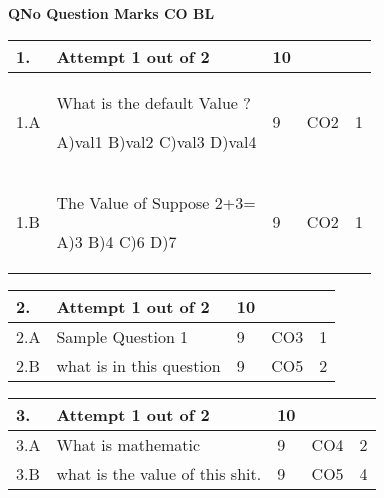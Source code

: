 \documentclass[12pt]{article}
\begin{document}
	\begin{flushleft}
	\bf{QNo}\hspace{1.2cm} \bf{Question} \hspace{5.5cm}  \bf{Marks} \hspace{0.2cm} \bf{CO} \hspace{0.2cm}	\bf{BL}	
	
\end{flushleft} 
	\begin{longtable}{|L{1cm}|L{8cm}|C{1cm}|C{1cm}|C{1cm}|}\hline
		\bf{1}. & \bf{Attempt} \bf1 \bf{out} of \bf2 & \bf10  & & \\ \hline
				1.A & What is the default Value ? \newline
					
		A)val1\newline
		B)val2\newline
		C)val3\newline
		D)val4 &
		9 &
		CO2&
		1 \\ \hline
		
				1.B & The Value of Suppose 2+3= \newline
					
		A)3\newline
		B)4\newline
		C)6\newline
		D)7 &
		9 &
		CO2&
		1 \\ \hline
		
		
	\end{longtable}

	\begin{longtable}{|L{1cm}|L{8cm}|C{1cm}|C{1cm}|C{1cm}|}\hline
	\bf2. & \bf{Attempt} \bf{1} \bf{out of} \bf{2} & \bf{10}  & & \\ \hline





		2.A &
	Sample Question 1 \newline
			
	 &  9 & CO3 & 1\\ \hline
		2.B &
	what is in this question \newline
			
	 &  9 & CO5 & 2\\ \hline
	\end{longtable}


\begin{longtable}{|L{1cm}|L{8cm}|C{1cm}|C{1cm}|C{1cm}|}\hline
	\bf3. & \bf{Attempt} \bf{1} \bf{out of} \bf{2} & \bf{10}  & & \\ \hline





		3.A &
	What is mathematic \newline
			
	 &  9 & CO4 & 2\\ \hline
		3.B &
	what is the value of this shit. \newline
			
	 &  9 & CO5 & 4\\ \hline
	\end{longtable}
\end{document}
